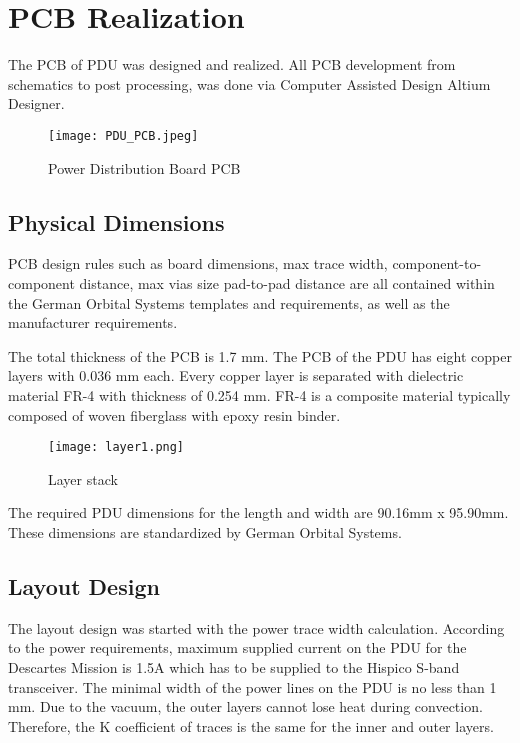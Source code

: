 \chapter{PCB Realization\label{cha:chapter5}}

The PCB of PDU was designed and realized. All PCB development from schematics to post processing, was done via Computer Assisted Design Altium Designer. 

\begin{figure}[h]
	\centering
	\texttt{[image: PDU\_PCB.jpeg]}
	\caption{Power Distribution Board PCB}
	\label{fig: PCB_PDU}
\end{figure} 

\section{Physical Dimensions}

PCB design rules such as board dimensions, max trace width, component-to-component distance, max vias size pad-to-pad distance are all contained within the German Orbital Systems templates and requirements, as well as the manufacturer requirements. 

The total thickness of the PCB is 1.7 mm. The PCB of the PDU has eight copper layers with 0.036 mm each. Every copper layer is separated with dielectric material FR-4 with thickness of 0.254 mm. FR-4 is a composite material typically composed of woven fiberglass with epoxy resin binder. 


\begin{figure}[h]
	\centering
	\texttt{[image: layer1.png]}
	\caption{Layer stack}
	\label{fig: layerstack}
\end{figure} 


The required PDU dimensions for the length and width are 90.16mm x 95.90mm. These dimensions are standardized by German Orbital Systems.

\section{Layout Design}

The layout design was started with the power trace width calculation.
According to the power requirements, maximum supplied current on the PDU for the Descartes Mission is 1.5A which has to be supplied to the Hispico S-band transceiver. The minimal width of the power lines on the PDU is no less than 1 mm. Due to the vacuum, the outer layers cannot lose heat during convection. Therefore, the K coefficient of traces is the same for the inner and outer layers.

